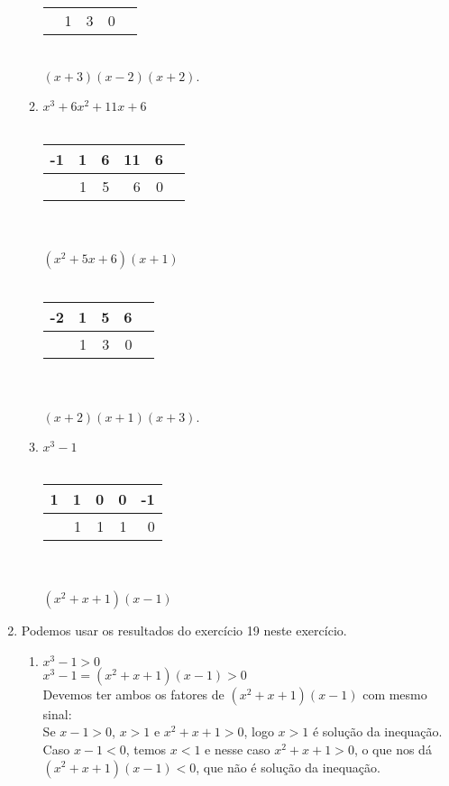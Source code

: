 \documentclass[10pt]{book}
\begin{document}
\begin{enumerate}
\begin{enumerate}
\begin{tabular}{ l | r r r r }
				\hline
			    & 1 & 3 & 0 \\
			\end{tabular}
			\\
			$(x+3)(x-2)(x+2)$.
			\item %
			$x^3+6x^2+11x+6$
			\\
			\\
			\begin{tabular}{ l | r r r r r}
			  -1 & 1 & 6 & 11 & 6\\
				\hline
			    & 1 & 5 & 6 & 0 \\
			\end{tabular}
			\\
			\\
			$(x^2+5x+6)(x+1)$
			\\
			\\
			\begin{tabular}{ l | r r r r }
			  -2 & 1 & 5 & 6 \\
				\hline
			    & 1 & 3 & 0 \\
			\end{tabular}
			\\
			\\
			$(x+2)(x+1)(x+3)$.
			\item %
			$x^3-1$
			\\
			\\
			\begin{tabular}{ l | r r r r }
			  1 & 1 & 0 & 0 & -1 \\
				\hline
			    & 1 & 1 & 1 & 0 \\
			\end{tabular}
			\\
			\\
			$(x^2+x+1)(x-1)$
	\end{enumerate}
	\item %
		Podemos usar os resultados do exercício 19 neste exercício.
		\begin{enumerate}
		\item %
			$x^3 - 1 > 0 $\\
			$x^3 -1 = (x^2+x+1)(x-1) > 0$\\
			Devemos ter ambos os fatores de $(x^2+x+1)(x-1)$ com mesmo sinal:\\
			Se $x-1 > 0$, $x > 1$ e $x^2+x+1 >0$, logo $x > 1$ é solução da inequação.\\
			Caso $x - 1 < 0$, temos $x < 1$ e nesse caso $x^2 + x + 1 > 0$, o que nos dá $(x^2+x+1)(x-1) < 0$, que não é solução da inequação.\\

\end{enumerate}
\end{enumerate}
\end{document}
